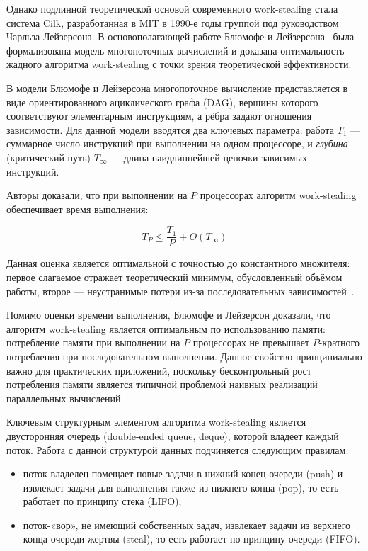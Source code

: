 Однако подлинной теоретической основой современного work-stealing
стала система Cilk, разработанная в MIT в 1990-е годы группой под
руководством Чарльза Лейзерсона. В основополагающей работе Блюмофе
и Лейзерсона~\cite{Blumofe1999} была формализована модель
многопоточных вычислений и доказана оптимальность жадного алгоритма
work-stealing с точки зрения теоретической эффективности.

В модели Блюмофе и Лейзерсона многопоточное вычисление представляется
в виде ориентированного ациклического графа (DAG), вершины которого
соответствуют элементарным инструкциям, а рёбра задают отношения
зависимости. Для данной модели вводятся два ключевых параметра:
работа $T_1$ --- суммарное число инструкций при выполнении
на одном процессоре, и \textit{глубина} (критический путь) $T_\infty$
--- длина наидлиннейшей цепочки зависимых инструкций.

Авторы доказали, что при выполнении на $P$ процессорах алгоритм
work-stealing обеспечивает время выполнения:

\begin{equation}
    T_P \leq \frac{T_1}{P} + O(T_\infty)
    \label{eq:work-stealing-bound}
\end{equation}

Данная оценка является оптимальной с точностью до константного
множителя: первое слагаемое отражает теоретический минимум,
обусловленный объёмом работы, второе --- неустранимые потери
из-за последовательных зависимостей~\cite{Blumofe1999}.

Помимо оценки времени выполнения, Блюмофе и Лейзерсон доказали,
что алгоритм work-stealing является оптимальным по использованию
памяти: потребление памяти при выполнении на $P$ процессорах
не превышает $P$-кратного потребления при последовательном выполнении.
Данное свойство принципиально важно для практических приложений,
поскольку бесконтрольный рост потребления памяти является типичной
проблемой наивных реализаций параллельных вычислений.

Ключевым структурным элементом алгоритма work-stealing является
двусторонняя очередь (double-ended queue, deque), которой владеет
каждый поток. Работа с данной структурой данных подчиняется следующим
правилам:

\begin{itemize}
    \item поток-владелец помещает новые задачи в нижний конец очереди
    (push) и извлекает задачи для выполнения также из нижнего конца
    (pop), то есть работает по принципу стека (LIFO);
    \item поток-«вор», не имеющий собственных задач, извлекает задачи
    из верхнего конца очереди жертвы (steal), то есть работает
    по принципу очереди (FIFO).
\end{itemize}

